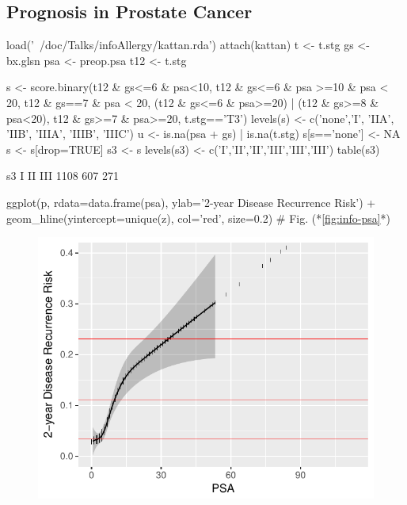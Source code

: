 \subsection{Prognosis in Prostate Cancer}
\begin{Schunk}
\begin{Sinput}
load('~/doc/Talks/infoAllergy/kattan.rda')
attach(kattan)
t   <- t.stg
gs  <- bx.glsn
psa <- preop.psa
t12 <- t.stg %

s <- score.binary(t12 & gs<=6 & psa<10,
                  t12 & gs<=6 & psa >=10 & psa < 20,
                  t12 & gs==7 & psa < 20,
                  (t12 & gs<=6 & psa>=20) |
                  (t12 & gs>=8 & psa<20),
                  t12 & gs>=7 & psa>=20,
                  t.stg=='T3')
levels(s) <- c('none','I', 'IIA', 'IIB', 'IIIA', 'IIIB', 'IIIC')
u <- is.na(psa + gs) | is.na(t.stg)
s[s=='none'] <- NA
s <- s[drop=TRUE]
s3 <- s
levels(s3) <- c('I','II','II','III','III','III')
table(s3)
\end{Sinput}
\begin{Soutput}
s3
   I   II  III 
1108  607  271 
\end{Soutput}
\begin{Sinput}
ggplot(p, rdata=data.frame(psa), ylab='2-year Disease Recurrence Risk') +
  geom_hline(yintercept=unique(z), col='red', size=0.2)   # Fig. (*\ref{fig:info-psa}*)
\end{Sinput}
\begin{figure}[htbp]

\centerline{\includegraphics{info-psa-1} }


\end{figure}
\end{Schunk}
